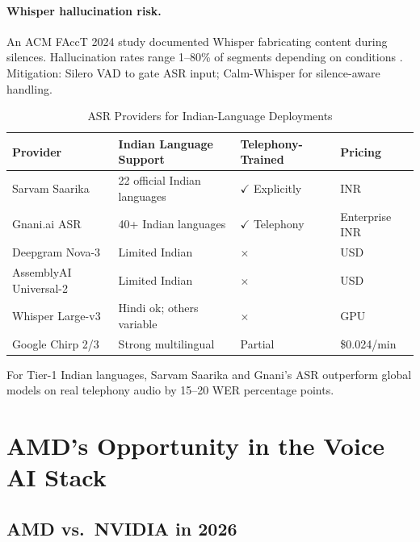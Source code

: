 \documentclass[12pt,a4paper]{article}
\begin{document}
\paragraph{Whisper hallucination risk.}
An ACM FAccT 2024 study documented Whisper fabricating content during
silences.  Hallucination rates range 1--80\% of segments depending on
conditions \cite{vexascribe-wer}.  Mitigation: Silero VAD to gate ASR input;
Calm-Whisper for silence-aware handling.

\begin{table}[H]\centering
\caption{ASR Providers for Indian-Language Deployments}
\label{tab:asr-india}
\small
\begin{tabularx}{\textwidth}{L{3.2cm}L{2.6cm}L{2.2cm}X}
\toprule
\textbf{Provider} & \textbf{Indian Language Support} & \textbf{Telephony-Trained} & \textbf{Pricing} \\
\midrule
Sarvam Saarika         & 22 official Indian languages & $\checkmark$ Explicitly & INR \\
Gnani.ai ASR           & 40+ Indian languages         & $\checkmark$ Telephony  & Enterprise INR \\
Deepgram Nova-3        & Limited Indian               & $\times$                & USD \\
AssemblyAI Universal-2 & Limited Indian               & $\times$                & USD \\
Whisper Large-v3       & Hindi ok; others variable    & $\times$                & GPU \\
Google Chirp 2/3       & Strong multilingual          & Partial                 & \$0.024/min \\
\bottomrule
\end{tabularx}
\end{table}

For Tier-1 Indian languages, Sarvam Saarika and Gnani's ASR outperform
global models on real telephony audio by 15--20 WER percentage points.

\section{AMD's Opportunity in the Voice AI Stack}
\label{sec:amd}

\subsection{AMD vs.\ NVIDIA in 2026}
\end{document}
